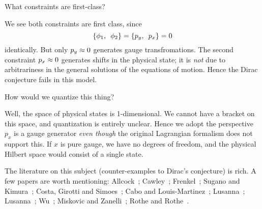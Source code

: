  What constraints are first-class?

\begin{soln}
We see both constraints are first class, since
\begin{equation}
\left\{\phi_{1},\enspace\phi_{2}\right\}=\left\{p_{y},\enspace p_{x}\right\}=0
\end{equation}
identically. But only $p_{y}\approx0$ generates gauge
transfromations. The second constraint $p_{x}\approx0$ generates shifts
in the physical state; it is \emph{not} due to arbitrariness in the
general solutions of the equations of motion. Hence the Dirac conjecture
fails in this model.
\end{soln}

 How would we quantize this thing?

\begin{soln}
Well, the space of physical states is 1-dimensional. We cannot have a
bracket on this space, and quantization is entirely unclear. Hence we
adopt the perspective $p_{x}$ is a gauge generator \emph{even though}
the original Lagrangian formalism does not support this. If $x$ is pure
gauge, we have no degrees of freedom, and the physical Hilbert space
would consist of a single state.
\end{soln}

The literature on this subject (counter-examples to Dirac's conjecture)
is rich. A few papers are worth mentioning: Allcock~\cite{allcock1975};
Cawley~\cite{PhysRevLett.42.413}; Frenkel~\cite{Frenkel:1980nt};
Sugano and Kimura~\cite{Sugano:1982sy}; Costa, Girotti and 
Simoes~\cite{Costa:1985tt}; Cabo and Louis-Martinez~\cite{Cabo:1990jk};
Lusanna~\cite{Lusanna:1991je}; Lusanna~\cite{Lusanna:1991im};
Wu~\cite{Wu:1994jd}; Miskovic and Zanelli~\cite{Miskovic:2003ex};
Rothe and Rothe~\cite{Rothe:2004jc}.

